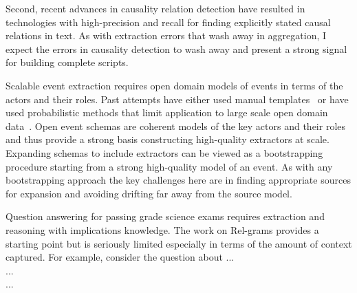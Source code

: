 \documentclass[a4paper,11pt,onecolumn]{article}
\begin{document}
Second, recent advances in causality relation detection have resulted in technologies with high-precision and recall for finding explicitly stated causal relations in text. As with extraction errors that wash away in aggregation, I expect the errors in causality detection to wash away and present a strong signal  for building complete scripts. 



Scalable event extraction requires open domain models of events in terms of the actors and their roles. Past attempts have either used manual templates~\cite{patwardhan-emnlp09} or have used probabilistic methods that limit application to large scale open domain data~\cite{cheung-naacl13,chambers-emnlp13}. Open event schemas are coherent models of the key actors and their roles and thus provide a strong basis constructing high-quality extractors at scale. Expanding schemas to include extractors can be viewed as a bootstrapping procedure starting from a strong high-quality model of an event. As with any bootstrapping approach the key challenges here are in finding appropriate sources for expansion and avoiding drifting far away from the source model. 

Question answering for passing grade science exams requires extraction and reasoning with implications knowledge. The work on Rel-grams provides a starting point but is seriously limited especially in terms of the amount of context captured. For example, consider the question about 
...\\
...\\
...\\
\end{document}
